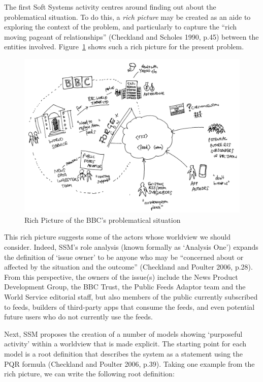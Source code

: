 \documentclass[a4paper]{article}
\begin{document}
The first Soft Systems activity centres around finding out about the problematical situation. To do this, a \textit{rich picture} may be created as an aide to exploring the context of the problem, and particularly to capture the ``rich moving pageant of relationships'' (Checkland and Scholes 1990, p.45) between the entities involved. Figure~\ref{rich-picture} shows such a rich picture for the present problem. 

\begin{figure}
  \includegraphics[width=\textwidth]{richpicture.png}
  \caption{Rich Picture of the BBC's problematical situation}
  \label{rich-picture}
\end{figure}

This rich picture suggests some of the actors whose worldview we should consider. Indeed, SSM's role analysis (known formally as `Analysis One') expands the definition of `issue owner' to be anyone who may be ``concerned about or affected by the situation and the outcome'' (Checkland and Poulter 2006, p.28). From this perspective, the owners of the issue(s) include the News Product Development Group, the BBC Trust, the Public Feeds Adaptor team and the World Service editorial staff, but also members of the public currently subscribed to feeds, builders of third-party apps that consume the feeds, and even potential future users who do not currently use the feeds.

Next, SSM proposes the creation of a number of models showing `purposeful activity' within a worldview that is made explicit. The starting point for each model is a root definition that describes the system as a statement using the PQR formula (Checkland and Poulter 2006, p.39). Taking one example from the rich picture, we can write the following root definition:
\end{document}
